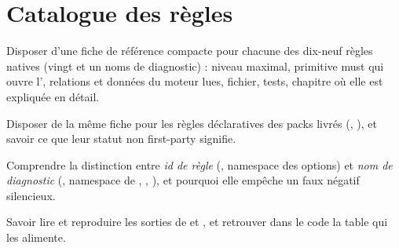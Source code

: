 \chapter{Catalogue des règles}
\label{chap:catalogue-regles}

\begin{objectifs}
  \item Disposer d'une fiche de référence compacte pour chacune des dix-neuf règles natives (vingt et un noms de diagnostic) : niveau maximal, primitive must qui ouvre l'\Error, relations et données du moteur lues, fichier, tests, chapitre où elle est expliquée en détail.
  \item Disposer de la même fiche pour les règles déclaratives des packs livrés (, ), et savoir ce que leur statut \og non first-party\fg{} signifie.
  \item Comprendre la distinction entre \emph{id de règle} (, namespace des options) et \emph{nom de diagnostic} (, namespace de , , ), et pourquoi elle empêche un faux négatif silencieux.
  \item Savoir lire et reproduire les sorties de  et , et retrouver dans le code la table qui les alimente.
\end{objectifs}


